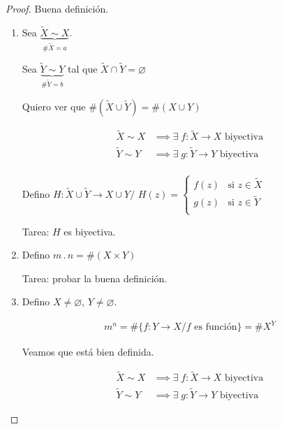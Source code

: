 \begin{proof} Buena definición.

    \begin{enumerate}
        \item Sea $\underbrace{\widetilde{X} \sim X}_{\# \widetilde{X} = a}$.

            Sea $\underbrace{\widetilde{Y} \sim Y}_{\# \widetilde{Y} = b}$ 
            tal que
            $\widetilde{X} \cap \widetilde{Y} = \varnothing$

            Quiero ver que 
            $\# (\widetilde{X} \cup \widetilde{Y}) = \# (X \cup Y)$

            \begin{align*}
                \widetilde{X} \sim X & \implies \exists \;
                f: \widetilde{X} \to X
                \text{ biyectiva}\\
                \widetilde{Y} \sim Y & \implies \exists \;
                g: \widetilde{Y} \to Y
                \text{ biyectiva}\\
            \end{align*}

            Defino $H: \widetilde{X} \cup \widetilde{Y} \to X \cup Y/$ 
            $H(z) = \begin{cases}
                f(z) & \text{si } z \in \widetilde{X} \\
                g(z) & \text{si } z \in \widetilde{Y} \\
            \end{cases}$

            Tarea: $H$ es biyectiva.

        \item Defino $m \, . \, n = \# (X \times Y)$

            Tarea: probar la buena definición.

        \item Defino $X \neq \varnothing$, $Y \neq \varnothing$.

            \begin{gather*}
                m^{n} = \# \{ f: Y \to X / f \text{ es función} \} = \# X^{Y}
            \end{gather*}

            Veamos que está bien definida.

            
            \begin{align*}
                \widetilde{X}\sim X &\implies \exists \; f: \widetilde{X} 
                \to X \text{ biyectiva}  \\
                \widetilde{Y}\sim Y &\implies \exists \; g: \widetilde{Y} 
                \to Y  \text{ biyectiva}
            \end{align*}


\end{enumerate}
\end{proof}
